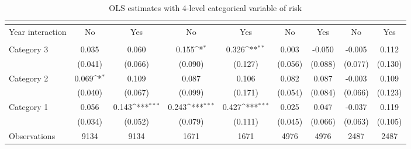 {
\def\sym#1{\ifmmode^{#1}\else\(^{#1}\)\fi}
\begin{longtable}{l*{8}{c}}
	\caption{OLS estimates with 4-level categorical variable of risk\label{table:8-robust-2}}	\\
\toprule
                &&&&\\
                \midrule 
                Year interaction & No & Yes & No & Yes & No & Yes & No & Yes \\
\midrule
\addlinespace
{} \\
\addlinespace
Category 3&    0.035         &    0.060         &    0.155\sym{*}  &    0.326\sym{**} &    0.003         &   -0.050         &   -0.005         &    0.112         \\
                &  (0.041)         &  (0.066)         &  (0.090)         &  (0.127)         &  (0.056)         &  (0.088)         &  (0.077)         &  (0.130)         \\
\addlinespace
Category 2&    0.069\sym{*}  &    0.109         &    0.087         &    0.106         &    0.082         &    0.087         &   -0.003         &    0.109         \\
                &  (0.040)         &  (0.067)         &  (0.099)         &  (0.171)         &  (0.054)         &  (0.084)         &  (0.066)         &  (0.123)         \\
\addlinespace
Category 1&    0.056         &    0.143\sym{***}&    0.243\sym{***}&    0.427\sym{***}&    0.025         &    0.047         &   -0.037         &    0.119         \\
                &  (0.034)         &  (0.052)         &  (0.079)         &  (0.111)         &  (0.045)         &  (0.066)         &  (0.063)         &  (0.105)         \\

\midrule
Observations    &     9134         &     9134         &     1671         &     1671         &     4976         &     4976         &     2487         &     2487         \\




\end{longtable}}
